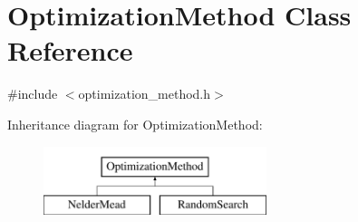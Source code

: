 \hypertarget{class_optimization_method}{}\section{Optimization\+Method Class Reference}
\label{class_optimization_method}


{\ttfamily \#include $<$optimization\+\_\+method.\+h$>$}

Inheritance diagram for Optimization\+Method\+:\begin{figure}[H]
\begin{center}
\leavevmode
\includegraphics[height=2.000000cm]{class_optimization_method}
\end{center}
\end{figure}
